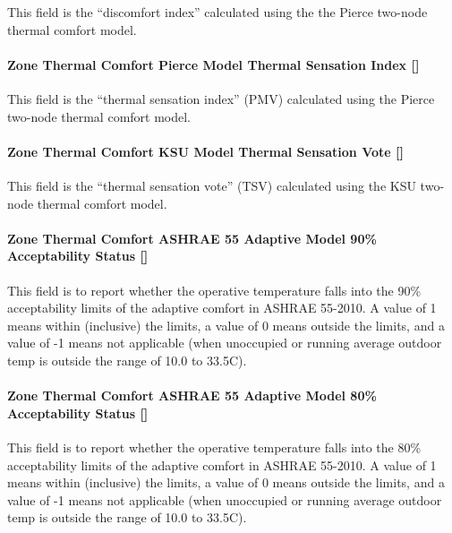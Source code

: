 This field is the ``discomfort index'' calculated using the the Pierce two-node thermal comfort model.

\paragraph{Zone Thermal Comfort Pierce Model Thermal Sensation Index {[]}}\label{zone-thermal-comfort-pierce-model-thermal-sensation-index}

This field is the ``thermal sensation index'' (PMV) calculated using the Pierce two-node thermal comfort model.

\paragraph{Zone Thermal Comfort KSU Model Thermal Sensation Vote {[]}}\label{zone-thermal-comfort-ksu-model-thermal-sensation-vote}

This field is the ``thermal sensation vote'' (TSV) calculated using the KSU two-node thermal comfort model.

\paragraph{Zone Thermal Comfort ASHRAE 55 Adaptive Model 90\% Acceptability Status {[]}}\label{zone-thermal-comfort-ashrae-55-adaptive-model-90-acceptability-status}

This field is to report whether the operative temperature falls into the 90\% acceptability limits of the adaptive comfort in ASHRAE 55-2010. A value of 1 means within (inclusive) the limits, a value of 0 means outside the limits, and a value of -1 means not applicable (when unoccupied or running average outdoor temp is outside the range of 10.0 to 33.5C).

\paragraph{Zone Thermal Comfort ASHRAE 55 Adaptive Model 80\% Acceptability Status {[]}}\label{zone-thermal-comfort-ashrae-55-adaptive-model-80-acceptability-status}

This field is to report whether the operative temperature falls into the 80\% acceptability limits of the adaptive comfort in ASHRAE 55-2010. A value of 1 means within (inclusive) the limits, a value of 0 means outside the limits, and a value of -1 means not applicable (when unoccupied or running average outdoor temp is outside the range of 10.0 to 33.5C).

